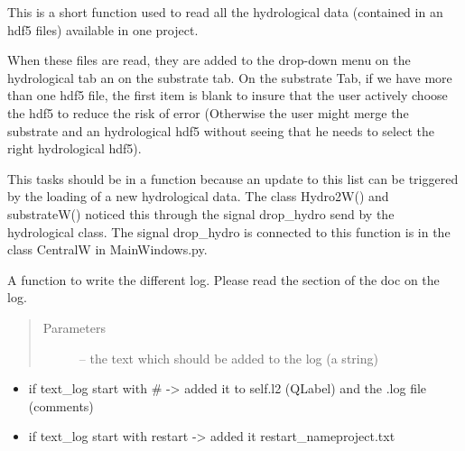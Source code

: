 \documentclass[letterpaper,10pt,english]{sphinxmanual}
\begin{document}
\begin{fulllineitems}

\begin{fulllineitems}
\label{\detokenize{index:src_GUI.Main_windows_1.CentralW.update_hydro_hdf5_name}}
This is a short function used to read all the hydrological data (contained in an hdf5 files) available in
one project.

When these files are read, they are added to the drop-down menu on the hydrological tab an on the substrate tab.
On the substrate Tab, if we have more than one hdf5 file, the first item is blank to insure that the user
actively choose the hdf5 to reduce the risk of error (Otherwise the user might merge the substrate and
an hydrological hdf5 without seeing that he needs to select the right hydrological hdf5).

This tasks should be in a function because an update to this list can be triggered by the loading of a new
hydrological data. The class Hydro2W() and substrateW() noticed this through the signal drop\_hydro
send by the hydrological class. The signal drop\_hydro is connected to this function is in the class
CentralW in MainWindows.py.

\end{fulllineitems}


\begin{fulllineitems}
\label{\detokenize{index:src_GUI.Main_windows_1.CentralW.write_log}}
A function to write the different log. Please read the section of the doc on the log.
\begin{quote}\begin{description}
\item[{Parameters}] \leavevmode
{} -- the text which should be added to the log (a string)

\end{description}\end{quote}
\begin{itemize}
\item {} 
if text\_log start with \# -\textgreater{} added it to self.l2 (QLabel) and the .log file (comments)

\item {} 
if text\_log start with restart -\textgreater{} added it restart\_nameproject.txt


\end{itemize}
\end{fulllineitems}
\end{fulllineitems}
\end{document}
